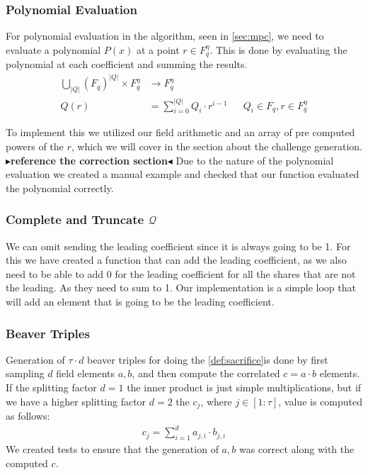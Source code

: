 \documentclass[11pt]{report}
\theoremstyle{definition}
\theoremstyle{plain}
\newcommand{\todo}[1]{{\color[rgb]{.5,0,0}\textbf{$\blacktriangleright$#1$\blacktriangleleft$}}}
\begin{document}
\subsubsection{Polynomial Evaluation}
For polynomial evaluation in the algorithm, seen in \autoref{sec:mpc}, we need to evaluate a polynomial $P(x)$ at a point $r \in F_q^\eta$. This is done by evaluating the polynomial at each coefficient and summing the results.
\begin{align}
  \textstyle\bigcup_{|Q|}(F_q)^{|Q|} \times F_q^\eta & \rightarrow F_q^\eta                 \nonumber                                                    \\
  Q(r)                                               & = \textstyle\sum_{i=0}^{|Q|} Q_i \cdot r^{i-1} &  & Q_i \in F_q, r \in F_q^\eta\label{eq:mpcpoly}
\end{align}

To implement this we utilized our field arithmetic and an array of pre computed powers of the $r$, which we will cover in the section about the challenge generation. \todo{reference the correction section}
Due to the nature of the polynomial evaluation we created a manual example and checked that our function evaluated the polynomial correctly.

\subsubsection{Complete and Truncate $\mathcal{Q}$}
We can omit sending the leading coefficient since it is always going to be 1. For this we have created a function that can add the leading coefficient, as we also need to be able to add 0 for the leading coefficient for all the shares that are not the leading. As they need to sum to 1. Our implementation is a simple loop that will add an element that is going to be the leading coefficient. 

\subsubsection{Beaver Triples}
Generation of $\tau \cdot d$ beaver triples for doing the \autoref{def:sacrifice}is done by first sampling $d$ field elements $a,b$, and then compute the correlated $c = a \cdot b$ elements. If the splitting factor $d=1$ the inner product is just simple multiplications, but if we have a higher splitting factor $d=2$ the $c_j$, where $j \in [1:\tau]$, value is computed as follows:
\begin{align}
  c_j = \sum_{i=1}^{d} a_{ j,i } \cdot b_{j,i}
\end{align}
We created tests to ensure that the generation of $a,b$ was correct along with the computed $c$.
\end{document}
